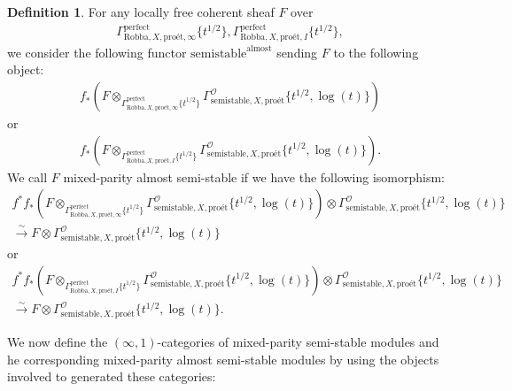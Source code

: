 \documentclass[12pt]{book}
\theoremstyle{definition}
\newtheorem{definition}{Definition}
\begin{document}
\begin{definition}
For any locally free coherent sheaf $F$ over
\begin{align}
\Gamma^\mathrm{perfect}_{\text{Robba},X,\text{pro\'et},\infty}\{t^{1/2}\},\Gamma^\mathrm{perfect}_{\text{Robba},X,\text{pro\'et},I}\{t^{1/2}\},
\end{align} 
we consider the following functor $\mathrm{semistable}^\mathrm{almost}$ sending $F$ to the following object:
\begin{align}
f_*(F\otimes_{\Gamma^\mathrm{perfect}_{\text{Robba},X,\text{pro\'et},\infty}\{t^{1/2}\}} \Gamma^\mathcal{O}_{\text{semistable},X,\text{pro\'et}}\{t^{1/2},\log(t)\})
\end{align}
or 
\begin{align}
f_*(F\otimes_{\Gamma^\mathrm{perfect}_{\text{Robba},X,\text{pro\'et},I}\{t^{1/2}\}} \Gamma^\mathcal{O}_{\text{semistable},X,\text{pro\'et}}\{t^{1/2},\log(t)\}).
\end{align}
We call $F$ mixed-parity almost semi-stable if we have the following isomorphism:
\begin{align}
f^*f_*(F\otimes_{\Gamma^\mathrm{perfect}_{\text{Robba},X,\text{pro\'et},\infty}\{t^{1/2}\}} \Gamma^\mathcal{O}_{\text{semistable},X,\text{pro\'et}}\{t^{1/2},\log(t)\}) \otimes \Gamma^\mathcal{O}_{\text{semistable},X,\text{pro\'et}}\{t^{1/2},\log(t)\} \\
\overset{\sim}{\longrightarrow} F \otimes \Gamma^\mathcal{O}_{\text{semistable},X,\text{pro\'et}}\{t^{1/2},\log(t)\} 
\end{align}
or 
\begin{align}
f^*f_*(F\otimes_{\Gamma^\mathrm{perfect}_{\text{Robba},X,\text{pro\'et},I}\{t^{1/2}\}} \Gamma^\mathcal{O}_{\text{semistable},X,\text{pro\'et}}\{t^{1/2},\log(t)\}) \otimes \Gamma^\mathcal{O}_{\text{semistable},X,\text{pro\'et}}\{t^{1/2},\log(t)\}\\ \overset{\sim}{\longrightarrow} F \otimes \Gamma^\mathcal{O}_{\text{semistable},X,\text{pro\'et}}\{t^{1/2},\log(t)\}. 
\end{align}
\end{definition}

\noindent We now define the $(\infty,1)$-categories of mixed-parity semi-stable modules and he corresponding mixed-parity almost semi-stable modules by using the objects involved to generated these categories:
\end{document}
